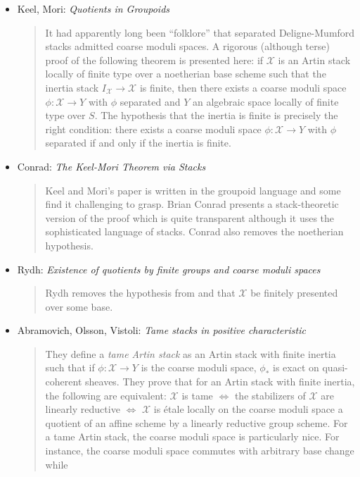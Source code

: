 \begin{itemize}
\item Keel, Mori: \emph{Quotients in Groupoids} \cite{K-M}
\begin{quote}
It had apparently long been ``folklore'' that separated Deligne-Mumford stacks
admitted coarse moduli spaces. A rigorous (although terse) proof of the
following theorem is presented here: if $\mathcal{X}$ is an Artin stack
locally of
finite type over a noetherian base scheme such that the inertia stack
$I_\mathcal{X}
\to \mathcal{X}$ is finite, then there exists a coarse moduli space $\phi:
\mathcal{X} \to Y$
with $\phi$ separated and $Y$ an algebraic space locally of finite type over
$S$. The hypothesis that the inertia is finite is precisely the right
condition: there exists a coarse moduli space $\phi: \mathcal{X} \to Y$ with
$\phi$
separated if and only if the inertia is finite.
\end{quote}
\item Conrad: \emph{The Keel-Mori Theorem via Stacks} \cite{conrad}
\begin{quote}
Keel and Mori's paper \cite{K-M} is written in the groupoid language and
some find it challenging to grasp. Brian Conrad presents a stack-theoretic
version of the proof which is quite transparent although it uses the
sophisticated language of stacks. Conrad also removes the noetherian
hypothesis.
\end{quote}
\item Rydh: \emph{Existence of quotients by finite groups and coarse moduli
spaces} \cite{rydh_quotients}
\begin{quote}
Rydh removes the hypothesis from \cite{K-M} and \cite{conrad} that
$\mathcal{X}$
be finitely presented over some base.
\end{quote}
\item
Abramovich, Olsson, Vistoli: \emph{Tame stacks in positive characteristic}
\cite{tame}
\begin{quote}
They define a \emph{tame Artin stack} as an Artin stack with finite inertia
such that if $\phi: \mathcal{X} \to Y$ is the coarse moduli space, $\phi_*$ is
exact
on quasi-coherent sheaves. They prove that for an Artin stack with finite
inertia, the following are equivalent: $\mathcal{X}$ is tame $\iff$ the
stabilizers of
$\mathcal{X}$ are linearly reductive $\iff$ $\mathcal{X}$ is \'etale locally on
the coarse
moduli space a quotient of an affine scheme by a linearly reductive group
scheme. For a tame Artin stack, the coarse moduli space is particularly nice.
For instance, the coarse moduli space commutes with arbitrary base change while

\end{quote}
\end{itemize}
